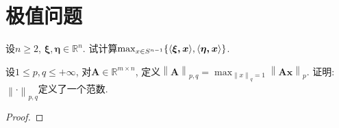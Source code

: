 \section{极值问题}
\begin{quiza}
\woe 设\(n\geqslant 2\), \(\boldsymbol{\xi,\eta}\in\mathbb{R}^n\). 试计算\(\max_{x\in S^{n-1}}\{\langle \boldsymbol{\xi,x} \rangle,\langle \boldsymbol{\eta,x} \rangle\}\).
\begin{solution}

\end{solution}
\woe  设\(1\leqslant p,q\leqslant+\infty\), 对\(\boldsymbol{A}\in\mathbb{R}^{m\times n}\), 定义\(\left\|\boldsymbol{A}\right\|_{p,q}=\max_{\left\|x\right\|_q=1}\left\|\boldsymbol{Ax}\right\|_p\). 证明: \(\left\|\cdot\right\|_{p,q}\)定义了一个范数.
\begin{proof}


\end{proof}
\end{quiza}
